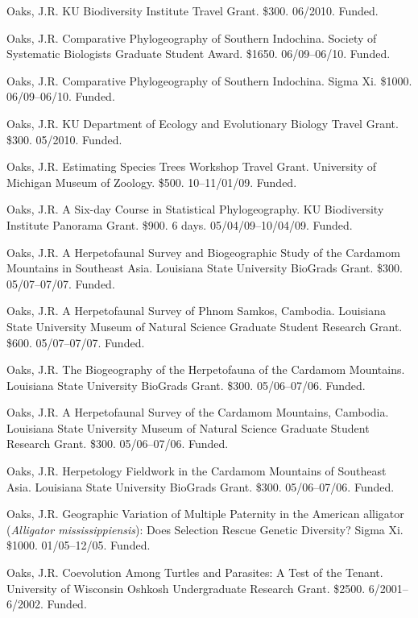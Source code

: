 \documentclass[10pt]{article}
\newcommand{\ignore}[1]{}
\newcommand{\myHangIndent}{\hangindent=5mm}
\begin{document}
\myHangIndent
Oaks, J.R.
KU Biodiversity Institute Travel Grant.
\$300.
06/2010.
Funded.

\myHangIndent
Oaks, J.R.
Comparative Phylogeography of Southern Indochina.
Society of Systematic Biologists Graduate Student Award.
\$1650.
06/09--06/10.
Funded.

\myHangIndent
Oaks, J.R.
Comparative Phylogeography of Southern Indochina.
Sigma Xi.
\$1000.
06/09--06/10.
Funded.

\ignore{
\myHangIndent
Oaks, J.R.
Comparative Phylogeography of Southern Indochina.
The Society for the Study of Amphibians and Reptiles Dean E. Metter Award.
\$800.
06/09--06/10.
Not funded.
}
\myHangIndent
Oaks, J.R.
KU Department of Ecology and Evolutionary Biology Travel Grant.
\$300.
05/2010.
Funded.

\myHangIndent
Oaks, J.R.
Estimating Species Trees Workshop Travel Grant.
University of Michigan Museum of Zoology.
\$500.
10--11/01/09.
Funded.

\myHangIndent
Oaks, J.R.
A Six-day Course in Statistical Phylogeography.
KU Biodiversity Institute Panorama Grant.
\$900.
6 days. 05/04/09--10/04/09.
Funded.

\myHangIndent
Oaks, J.R.
A Herpetofaunal Survey and Biogeographic Study of the Cardamom Mountains in Southeast Asia.
Louisiana State University BioGrads Grant.
\$300.
05/07--07/07.
Funded.

\myHangIndent
Oaks, J.R.
A Herpetofaunal Survey of Phnom Samkos, Cambodia.
Louisiana State University Museum of Natural Science Graduate Student Research Grant.
\$600.
05/07--07/07.
Funded.

\myHangIndent
Oaks, J.R.
The Biogeography of the Herpetofauna of the Cardamom Mountains.
Louisiana State University BioGrads Grant.
\$300.
05/06--07/06.
Funded.

\myHangIndent
Oaks, J.R.
A Herpetofaunal Survey of the Cardamom Mountains, Cambodia.
Louisiana State University Museum of Natural Science Graduate Student Research Grant.
\$300.
05/06--07/06.
Funded.

\myHangIndent
Oaks, J.R.
Herpetology Fieldwork in the Cardamom Mountains of Southeast Asia.
Louisiana State University BioGrads Grant.
\$300.
05/06--07/06.
Funded.

\myHangIndent
Oaks, J.R.
Geographic Variation of Multiple Paternity in the American alligator (\emph{Alligator mississippiensis}): Does Selection Rescue Genetic Diversity?
Sigma Xi.
\$1000.
01/05--12/05.
Funded.

\myHangIndent
Oaks, J.R.
Coevolution Among Turtles and Parasites: A Test of the Tenant.
University of Wisconsin Oshkosh Undergraduate Research Grant.
\$2500.
6/2001--6/2002.
Funded.
\end{document}
